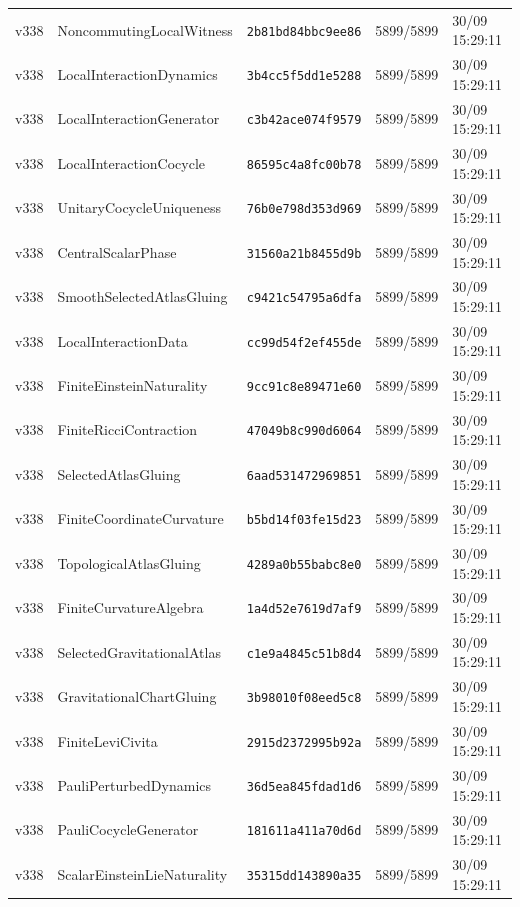 \documentclass[11pt]{article}
\theoremstyle{definition}\newtheorem{deriv}{Derivação}
\begin{document}
{\begin{longtable}{@{}lllll@{}}
v338 & NoncommutingLocalWitness & \texttt{2b81bd84bbc9ee86} & 5899/5899 & 30/09 15:29:11 \\
v338 & LocalInteractionDynamics & \texttt{3b4cc5f5dd1e5288} & 5899/5899 & 30/09 15:29:11 \\
v338 & LocalInteractionGenerator & \texttt{c3b42ace074f9579} & 5899/5899 & 30/09 15:29:11 \\
v338 & LocalInteractionCocycle & \texttt{86595c4a8fc00b78} & 5899/5899 & 30/09 15:29:11 \\
v338 & UnitaryCocycleUniqueness & \texttt{76b0e798d353d969} & 5899/5899 & 30/09 15:29:11 \\
v338 & CentralScalarPhase & \texttt{31560a21b8455d9b} & 5899/5899 & 30/09 15:29:11 \\
v338 & SmoothSelectedAtlasGluing & \texttt{c9421c54795a6dfa} & 5899/5899 & 30/09 15:29:11 \\
v338 & LocalInteractionData & \texttt{cc99d54f2ef455de} & 5899/5899 & 30/09 15:29:11 \\
v338 & FiniteEinsteinNaturality & \texttt{9cc91c8e89471e60} & 5899/5899 & 30/09 15:29:11 \\
v338 & FiniteRicciContraction & \texttt{47049b8c990d6064} & 5899/5899 & 30/09 15:29:11 \\
v338 & SelectedAtlasGluing & \texttt{6aad531472969851} & 5899/5899 & 30/09 15:29:11 \\
v338 & FiniteCoordinateCurvature & \texttt{b5bd14f03fe15d23} & 5899/5899 & 30/09 15:29:11 \\
v338 & TopologicalAtlasGluing & \texttt{4289a0b55babc8e0} & 5899/5899 & 30/09 15:29:11 \\
v338 & FiniteCurvatureAlgebra & \texttt{1a4d52e7619d7af9} & 5899/5899 & 30/09 15:29:11 \\
v338 & SelectedGravitationalAtlas & \texttt{c1e9a4845c51b8d4} & 5899/5899 & 30/09 15:29:11 \\
v338 & GravitationalChartGluing & \texttt{3b98010f08eed5c8} & 5899/5899 & 30/09 15:29:11 \\
v338 & FiniteLeviCivita & \texttt{2915d2372995b92a} & 5899/5899 & 30/09 15:29:11 \\
v338 & PauliPerturbedDynamics & \texttt{36d5ea845fdad1d6} & 5899/5899 & 30/09 15:29:11 \\
v338 & PauliCocycleGenerator & \texttt{181611a411a70d6d} & 5899/5899 & 30/09 15:29:11 \\
v338 & ScalarEinsteinLieNaturality & \texttt{35315dd143890a35} & 5899/5899 & 30/09 15:29:11 \\

\end{longtable}}
\end{document}
